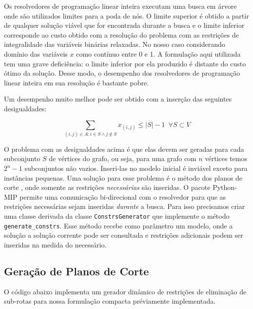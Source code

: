 \documentclass[a4paper,11pt,fleqn]{article}
\begin{document}
Os resolvedores de programação linear inteira executam uma busca em árvore onde são utilizados limites para a poda de nós. O limite superior é obtido a partir de qualquer solução viável que for encontrada durante a busca e o limite inferior corresponde ao custo obtido com a resolução do problema com as restrições de integralidade das variáveis binárias relaxadas. No nosso caso considerando domínio das variáveis $x$ como contínuo entre 0 e 1. A formulação aqui utilizada tem uma grave deficiência: o limite inferior por ela produzido é distante do custo ótimo da solução. Desse modo, o desempenho dos resolvedores de programação linear inteira em sua resolução é bastante pobre. 

Um desempenho muito melhor pode ser obtido com a inserção das seguintes desigualdades:

\begin{equation}
\sum_{(i,j) \in A : i\in S \land j \notin S} x_{(i,j)} \leq |S|-1 \,\,\, \forall S \subset V 
\end{equation}

O problema com as desigualdades acima é que elas devem ser geradas para cada subconjunto $S$ de vértices do grafo, ou seja, para uma grafo com $n$ vértices temos $2^n-1$ subconjuntos não vazios. Inseri-las no modelo inicial é inviável exceto para instâncias pequenas. Uma solução para esse problema é o método dos planos de corte \citep{Dantzig54}, onde somente as restrições \emph{necessárias} são inseridas. O pacote Python-MIP permite uma comunicação bi-direcional com o resolvedor para que as restrições necessárias sejam inseridas \emph{durante} a busca. Para isso precisamos criar uma classe derivada da classe \texttt{ConstrsGenerator} que implemente o método \texttt{generate\_constrs}. Esse método recebe como parâmetro um modelo, onde a solução a solução corrente pode ser consultada e restrições adicionais podem ser inseridas na medida do necessário.

\subsection{Geração de Planos de Corte}

O código abaixo implementa um gerador dinâmico de restrições de eliminação de sub-rotas para nossa formulação compacta préviamente implementada.
\end{document}
